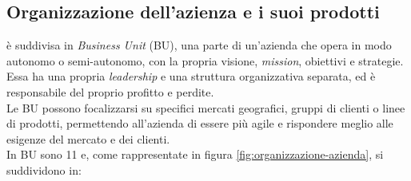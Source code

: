 \subsection{Organizzazione dell'azienza e i suoi prodotti}
{\azienda} è suddivisa in \textit{Business Unit} (BU), una parte di un'azienda che opera in modo autonomo o semi-autonomo, 
con la propria visione, \textit{mission}, obiettivi e strategie. Essa ha una propria \textit{leadership} e una struttura 
organizzativa separata, ed è responsabile del proprio profitto e perdite. \\
Le BU possono focalizzarsi su 
specifici mercati geografici, gruppi di clienti o linee di prodotti, permettendo all'azienda di essere 
più agile e rispondere meglio alle esigenze del mercato e dei clienti.\\
In {\azienda} BU sono 11 e, come rappresentate in figura \ref{fig:organizzazione-azienda}, si suddividono in:
